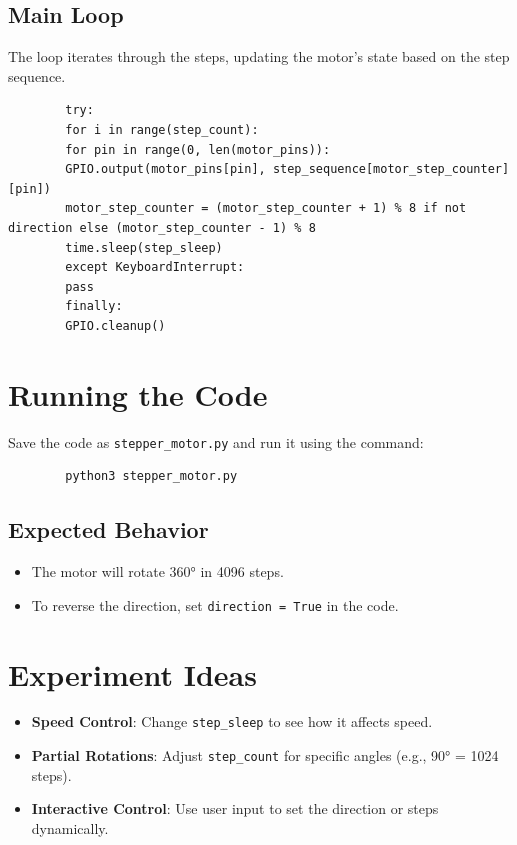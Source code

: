 \documentclass{article}
\begin{document}
	\subsection*{Main Loop}
	The loop iterates through the steps, updating the motor's state based on the step sequence.
	
	\begin{lstlisting}
		try:
		for i in range(step_count):
		for pin in range(0, len(motor_pins)):
		GPIO.output(motor_pins[pin], step_sequence[motor_step_counter][pin])
		motor_step_counter = (motor_step_counter + 1) % 8 if not direction else (motor_step_counter - 1) % 8
		time.sleep(step_sleep)
		except KeyboardInterrupt:
		pass
		finally:
		GPIO.cleanup()
	\end{lstlisting}
	
	\section*{Running the Code}
	Save the code as \texttt{stepper\_motor.py} and run it using the command:
	\begin{lstlisting}
		python3 stepper_motor.py
	\end{lstlisting}
	
	\subsection*{Expected Behavior}
	\begin{itemize}
		\item The motor will rotate 360° in 4096 steps.
		\item To reverse the direction, set \texttt{direction = True} in the code.
	\end{itemize}
	
	\section*{Experiment Ideas}
	\begin{itemize}
		\item \textbf{Speed Control}: Change \texttt{step\_sleep} to see how it affects speed.
		\item \textbf{Partial Rotations}: Adjust \texttt{step\_count} for specific angles (e.g., 90° = 1024 steps).
		\item \textbf{Interactive Control}: Use user input to set the direction or steps dynamically.
	\end{itemize}
	
\end{document}
